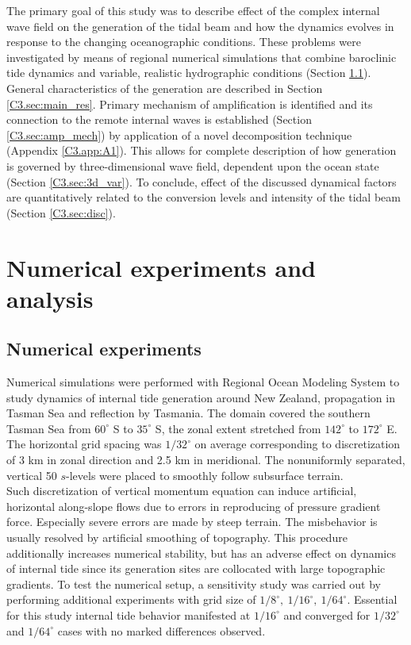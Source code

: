 \documentclass[12pt]{article}
\begin{document}
The primary goal of this study was to describe effect of the complex internal wave field on the 
generation of the tidal beam and how the dynamics evolves in response to the changing oceanographic 
conditions. These problems were investigated by means of regional numerical simulations that 
combine baroclinic tide dynamics and variable, realistic hydrographic conditions (Section 
\ref{C3.sec:model}). General 
characteristics of the generation are described in Section \ref{C3.sec:main_res}. Primary 
mechanism of 
amplification is identified and its connection to the remote internal waves is established 
(Section \ref{C3.sec:amp_mech}) by application of a novel decomposition technique (Appendix 
\ref{C3.app:A1}). 
This allows for 
complete description of how generation is governed by three-dimensional wave field, dependent upon 
the ocean state (Section \ref{C3.sec:3d_var}). To conclude, effect of the discussed dynamical 
factors are quantitatively related to the conversion levels and intensity of the tidal beam 
(Section \ref{C3.sec:disc}).\\
 
\newpage

\section{Numerical experiments and analysis}
\subsection{Numerical experiments}
\label{C3.sec:model}
Numerical simulations were performed with Regional Ocean Modeling System 
\citep{shchepetkin2005regional} to study dynamics of internal tide generation around New Zealand, 
propagation in Tasman Sea and reflection by Tasmania. The domain covered the southern Tasman Sea 
from $60^{\circ}$ S to $35^{\circ}$ S, the zonal extent stretched from $142^{\circ}$ to 
$172^{\circ}$ E. The horizontal grid spacing was $1/32^{\circ}$ on average corresponding to 
discretization of 3 km 
in zonal direction and 2.5 km in meridional. The nonuniformly separated, vertical 50 $s$-levels 
were placed to smoothly follow subsurface terrain.\\
Such discretization of vertical momentum equation can induce artificial, horizontal  
along-slope flows \citep{haidvogel1999numerical} due to errors in reproducing of pressure 
gradient force. Especially severe errors are made by steep terrain. The misbehavior is usually 
resolved by artificial smoothing of topography. This procedure additionally increases numerical 
stability, but has an adverse effect on dynamics of internal tide \citep{di2006numerical} since 
its generation sites are collocated with large topographic gradients. To test the numerical 
setup, a sensitivity study was carried out by performing additional experiments with grid size of   
$1/8^{\circ},~1/16^{\circ},~1/64^{\circ}$. Essential for this study 
internal tide behavior manifested at $1/16^{\circ}$ and converged for $1/32^{\circ}$ and 
$1/64^{\circ}$ cases with no marked differences observed.\\
\end{document}
